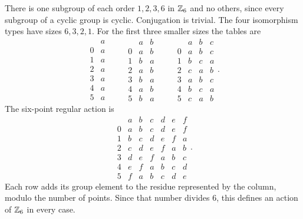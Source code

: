 There is one subgroup of each order $1,2,3,6$ in $\mathbb{Z}_6$ and no others,
since every subgroup of a cyclic group is cyclic. Conjugation is trivial.
The four isomorphism types have sizes $6,3,2,1$.
For the first three smaller sizes the tables are
\[
\begin{array}{c|c}&a\\\hline0&a\\1&a\\2&a\\3&a\\4&a\\5&a\end{array}
\qquad
\begin{array}{c|cc}&a&b\\\hline0&a&b\\1&b&a\\2&a&b\\3&b&a\\4&a&b\\5&b&a\end{array}
\qquad
\begin{array}{c|ccc}&a&b&c\\\hline
0&a&b&c\\1&b&c&a\\2&c&a&b\\3&a&b&c\\4&b&c&a\\5&c&a&b
\end{array}.
\]
The six-point regular action is
\[
\begin{array}{c|cccccc}&a&b&c&d&e&f\\\hline
0&a&b&c&d&e&f\\1&b&c&d&e&f&a\\2&c&d&e&f&a&b\\
3&d&e&f&a&b&c\\4&e&f&a&b&c&d\\5&f&a&b&c&d&e
\end{array}.
\]
Each row adds its group element to the residue represented by the column,
modulo the number of points. Since that number divides $6$, this defines
an action of $\mathbb{Z}_6$ in every case.


